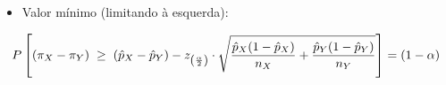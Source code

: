\documentclass[
]{book}
\providecommand{\tightlist}{%
  \setlength{\itemsep}{0pt}\setlength{\parskip}{0pt}}
\begin{document}
\hfill\break

\begin{itemize}
\tightlist
\item
  Valor mínimo (limitando à esquerda):
\end{itemize}

\hfill\break

\[
P\left[(\pi_{X}-\pi_{Y})  \hspace{0.1cm} \ge \hspace{0.1cm} (\hat{p}_{X}-\hat{p}_{Y}) - {z}_{\left(\frac{\alpha }{2}\right)} \cdot \sqrt{{\frac{\hat{p}_{X}(1-\hat{p}_{X})}{n_{X}}+ \frac{\hat{p}_{Y}(1-\hat{p}_{Y})}{n_{Y}}}}\right] = (1-\alpha)
\]

  
\end{document}
